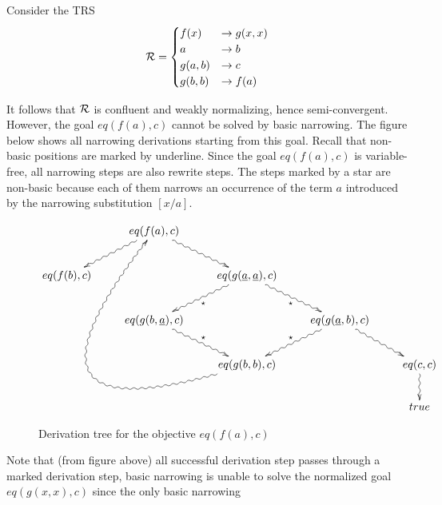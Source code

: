 Consider the TRS
\begin{displaymath}
    \mathcal{R} =
	\begin{cases}
		f(x) & \rightarrow g(x,x)                               \\
        a & \rightarrow b \\
        g(a,b) & \rightarrow c \\
        g(b,b) & \rightarrow f(a)
	\end{cases}
\end{displaymath}

It follows that $\mathcal{R}$ is confluent and weakly normalizing, hence semi-convergent. However, the goal $eq(f(a),c)$ cannot be solved by basic narrowing. The figure below shows all narrowing derivations starting from this goal. Recall that non-basic positions are marked by underline. Since the goal $eq(f(a),c)$ is variable-free, all narrowing steps are also rewrite steps. The steps marked by a star are non-basic because each of them narrows an occurrence of the term $a$ introduced by the narrowing substitution $[x / a]$.
\begin{figure}[!ht]
    \begin{displaymath}
        \xymatrix{
            & eq(f(a),c)\ar@{~>}[dr] \ar@{~>}[dl] &  &  &  \\
            eq(f(b),c) &  & eq(g(\underline{a},\underline{a}), c) \ar@{~>}[dl]^{\star} \ar@{~>}[dr]_{\star} &  & \\
            & eq(g(b,\underline{a}),c) \ar@{~>}[dr]^{\star} & & eq(g(\underline{a},b),c) \ar@{~>}[dl]_{\star} \ar@{~>}[dr] &\\
            & & eq(g(b,b),c) \ar@{~>}@/^10pc/[lluuur] & & eq(c,c) \ar@{~>}[d]\\
            & &  & & true
        }
    \end{displaymath}
    \caption{Derivation tree for the objective $eq(f(a),c)$}
    \label{figure:counterexample}
\end{figure}

Note that (from figure above) all successful derivation step passes through a marked derivation step, basic narrowing is unable to solve the normalized goal $eq(g(x,x),c)$ since the only basic narrowing
